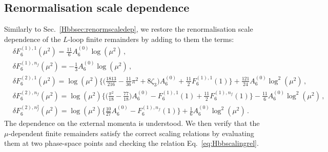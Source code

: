 \documentclass[main.tex]{subfiles}
\begin{document}
\subsection{Renormalisation scale dependence}
\label{wyjsec:scaledep}
Similarly to Sec.~\ref{Hbbsec:renormscaledep}, we restore the renormalisation scale dependence of the $L$-loop finite remainders by adding to them the terms:
\begingroup
\allowdisplaybreaks
\begin{align}
& \delta F^{(1),1}_6\left(\mu^2\right) = \frac{11}{6} A_6^{(0)} \log\left(\mu^2\right) \,, \\
& \delta F^{(1),n_f}_6\left(\mu^2\right) = - \frac{1}{3} A_6^{(0)} \log\left(\mu^2\right) \,, \\
& \delta F^{(2),1}_6\left(\mu^2\right) = \log(\mu^2) \bigg\lbrace \bigg(\frac{1813}{216} - \frac{11}{36}\pi^2 + 8 \zeta_3\bigg) A^{(0)}_6 + \frac{11}{2}F^{(1),1}_6(1) \bigg\rbrace
                             + \frac{121}{24} A^{(0)}_6 \log^2(\mu^2) \,, \\
& \delta F^{(2),n_f}_6\left(\mu^2\right) = \log(\mu^2) \bigg\lbrace \bigg(\frac{\pi^2}{18} -\frac{77}{18}  \bigg) A^{(0)}_6 
                                                                 - F^{(1),1}_6(1)  + \frac{11}{2}F^{(1),n_f}_6(1) \bigg\rbrace - \frac{11}{6} A^{(0)}_6 \log^2(\mu^2) \,, \\
& \delta F^{(2),n_f^2}_6\left(\mu^2\right) = \log(\mu^2) \bigg\lbrace \frac{10}{27} A^{(0)}_6 -  F^{(1),n_f}_6(1) \bigg\rbrace + \frac{1}{6} A^{(0)}_6 \log^2(\mu^2) \,.
\end{align}
\endgroup
The dependence on the external momenta is understood. We then verify that the $\mu$-dependent finite remainders satisfy the correct scaling relations by evaluating them at two phase-space points and checking the relation Eq.~\ref{eq:Hbbscalingrel}.
\end{document}
